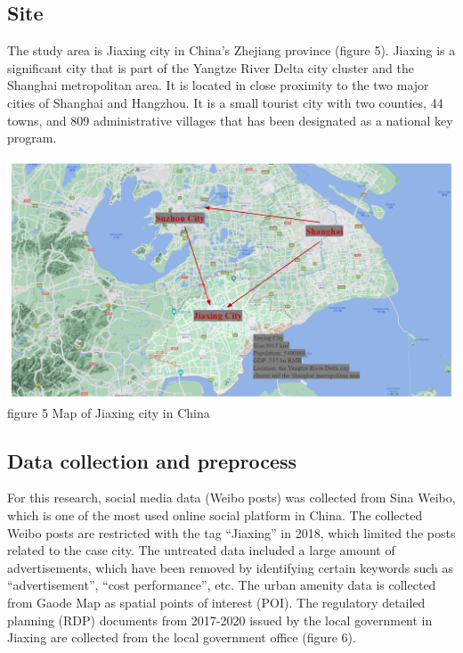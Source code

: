\documentclass[
]{article}
\begin{document}
\hypertarget{site}{%
\subsection{Site}\label{site}}

The study area is Jiaxing city in China's Zhejiang province (figure 5).
Jiaxing is a significant city that is part of the Yangtze River Delta
city cluster and the Shanghai metropolitan area. It is located in close
proximity to the two major cities of Shanghai and Hangzhou. It is a
small tourist city with two counties, 44 towns, and 809 administrative
villages that has been designated as a national key program.

\href{https://WTHSYZW.github.io/Thesis_2022/maps/jiaxing.png}{\includegraphics{maps/jiaxing.png}}
figure 5 Map of Jiaxing city in China

\hypertarget{data-collection-and-preprocess}{%
\subsection{Data collection and
preprocess}\label{data-collection-and-preprocess}}

For this research, social media data (Weibo posts) was collected from
Sina Weibo, which is one of the most used online social platform in
China. The collected Weibo posts are restricted with the tag ``Jiaxing''
in 2018, which limited the posts related to the case city. The untreated
data included a large amount of advertisements, which have been removed
by identifying certain keywords such as ``advertisement'', ``cost
performance'', etc. The urban amenity data is collected from Gaode Map
as spatial points of interest (POI). The regulatory detailed planning
(RDP) documents from 2017-2020 issued by the local government in Jiaxing
are collected from the local government office (figure 6).
\end{document}
